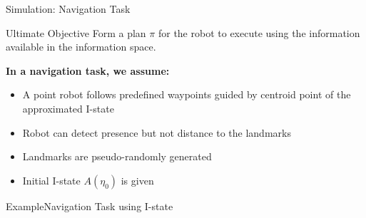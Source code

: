 \documentclass[10pt]{beamer}
\begin{document}
\begin{frame}{Simulation: Navigation Task}
 \begin{block}{Ultimate Objective} 
   Form a plan $\pi$ for the robot to execute using the information available in
   the information space.
 \end{block}

\textbf{In a navigation task, we assume:}
\begin{itemize}
\item A point robot follows predefined waypoints guided by centroid point of the
  approximated I-state
\item Robot can detect presence but not distance to the landmarks
\item Landmarks are pseudo-randomly generated
\item Initial I-state $A(\eta_0)$ is given
\end{itemize}
\end{frame}

\begin{frame}{Example}{Navigation Task using I-state}
  \begin{center}
  \end{center}
\end{frame} 

\end{document}
